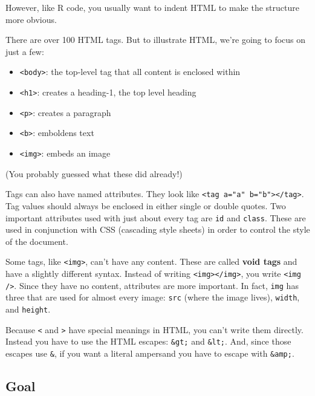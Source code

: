 However, like R code, you usually want to indent HTML to make the
structure more obvious.

There are over 100 HTML tags. But to illustrate HTML, we're going to
focus on just a few:

\begin{itemize}
\itemsep1pt\parskip0pt
\item
  \texttt{\textless{}body\textgreater{}}: the top-level tag that all
  content is enclosed within
\item
  \texttt{\textless{}h1\textgreater{}}: creates a heading-1, the top
  level heading
\item
  \texttt{\textless{}p\textgreater{}}: creates a paragraph
\item
  \texttt{\textless{}b\textgreater{}}: emboldens text
\item
  \texttt{\textless{}img\textgreater{}}: embeds an image
\end{itemize}

(You probably guessed what these did already!)

Tags can also have named attributes. They look like
\texttt{\textless{}tag a="a" b="b"\textgreater{}\textless{}/tag\textgreater{}}.
Tag values should always be enclosed in either single or double quotes.
Two important attributes used with just about every tag are \texttt{id}
and \texttt{class}. These are used in conjunction with CSS (cascading
style sheets) in order to control the style of the document.

Some tags, like \texttt{\textless{}img\textgreater{}}, can't have any
content. These are called \textbf{void tags} and have a slightly
different syntax. Instead of writing
\texttt{\textless{}img\textgreater{}\textless{}/img\textgreater{}}, you
write \texttt{\textless{}img /\textgreater{}}. Since they have no
content, attributes are more important. In fact, \texttt{img} has three
that are used for almost every image: \texttt{src} (where the image
lives), \texttt{width}, and \texttt{height}.

Because \texttt{\textless{}} and \texttt{\textgreater{}} have special
meanings in HTML, you can't write them directly. Instead you have to use
the HTML escapes: \texttt{\&gt;} and \texttt{\&lt;}. And, since those
escapes use \texttt{\&}, if you want a literal ampersand you have to
escape with \texttt{\&amp;}.

\subsection{Goal}

